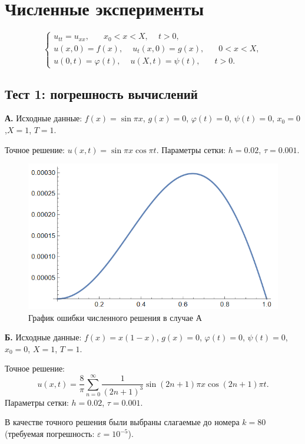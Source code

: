 \documentclass[12pt, a4paper]{article}
\begin{document}
	\section{Численные эксперименты}
	
		\[
	\begin{cases}
		u_{tt} = u_{xx}, \phantom{xxx} x_0<x<X, \phantom{xx} t>0, \\
		u(x,0) = f(x), \phantom{xx} u_t(x,0) = g(x), \phantom{xxx} 0<x<X,\\
		u(0,t) = \varphi(t), \phantom{xx} u(X,t) =\psi(t), \phantom{xxx} t>0.
	\end{cases}
	\]
	
	\subsection{Тест 1: погрешность вычислений}
	
	\textbf{А.} Исходные данные: $f(x)=\sin\pi x$, $g(x)=0$, $\varphi(t)=0$, $\psi(t)=0$, $x_0 = 0$,$X=1$, $T= 1$.
	
	Точное решение: $u(x,t) = \sin \pi x \cos \pi t$. Параметры сетки: $h=0.02$, $\tau=0.001$.
	
	\begin{figure}[H]
		\centering
		\includegraphics[width=1\textwidth]{errors1}
		\caption{График ошибки численного решения в случае А}
	\end{figure}

	\textbf{Б.} Исходные данные: $f(x)=x(1-x)$, $g(x)=0$, $\varphi(t)=0$, $\psi(t)=0$, $x_0=0$, $X=1$, $T= 1$.
	
	Точное решение:
	\[
	u(x,t) = \dfrac8\pi \sum_{n=0}^{\infty} \dfrac{1}{(2n+1)^3}\sin(2n+1)\pi x \cos(2n+1)\pi t.
	\]
	 Параметры сетки: $h=0.02$, $\tau=0.001$.
	 
	В качестве точного решения были выбраны слагаемые до номера $k=80$ (требуемая погрешность: $\varepsilon = 10^{-5}$).
	
\end{document}
